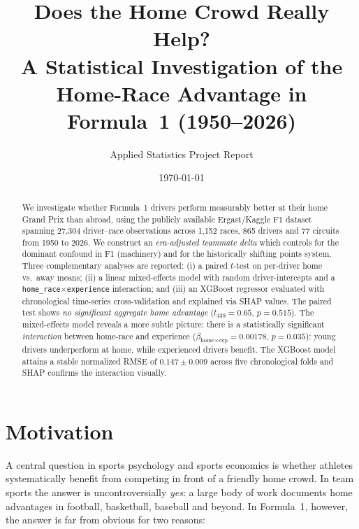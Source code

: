 \documentclass[11pt,a4paper]{article}
\title{\textbf{Does the Home Crowd Really Help?}\\[2pt]
\large A Statistical Investigation of the Home-Race Advantage in Formula~1
(1950--2026)}
\author{Applied Statistics Project Report}
\date{\today}
\begin{document}
\maketitle

\begin{abstract}
We investigate whether Formula~1 drivers perform measurably better at their
home Grand Prix than abroad, using the publicly available Ergast/Kaggle F1
dataset spanning 27{,}304 driver--race observations across 1{,}152 races,
865 drivers and 77 circuits from 1950 to 2026. We construct an
\emph{era-adjusted teammate delta} which controls for the dominant confound
in F1 (machinery) and for the historically shifting points system. Three
complementary analyses are reported: (i) a paired $t$-test on per-driver home
vs.\ away means; (ii) a linear mixed-effects model with random
driver-intercepts and a \texttt{home\_race}$\times$\texttt{experience} interaction;
and (iii) an XGBoost regressor evaluated with chronological time-series
cross-validation and explained via SHAP values. The paired test shows
\emph{no significant aggregate home advantage} ($t_{439}=0.65$, $p=0.515$).
The mixed-effects model reveals a more subtle picture: there is a
statistically significant \emph{interaction} between home-race and experience
($\beta_{\text{home}\times\text{exp}}=0.00178$, $p=0.035$): young drivers
underperform at home, while experienced drivers benefit. The XGBoost model
attains a stable normalized RMSE of $0.147\pm 0.009$ across five
chronological folds and SHAP confirms the interaction visually.
\end{abstract}

\tableofcontents
\vspace{1em}

\section{Motivation}

A central question in sports psychology and sports economics is whether
athletes systematically benefit from competing in front of a friendly home
crowd. In team sports the answer is uncontroversially \emph{yes}: a large body
of work documents home advantages in football, basketball, baseball and
beyond. In Formula~1, however, the answer is far from obvious for two reasons:
\end{document}
